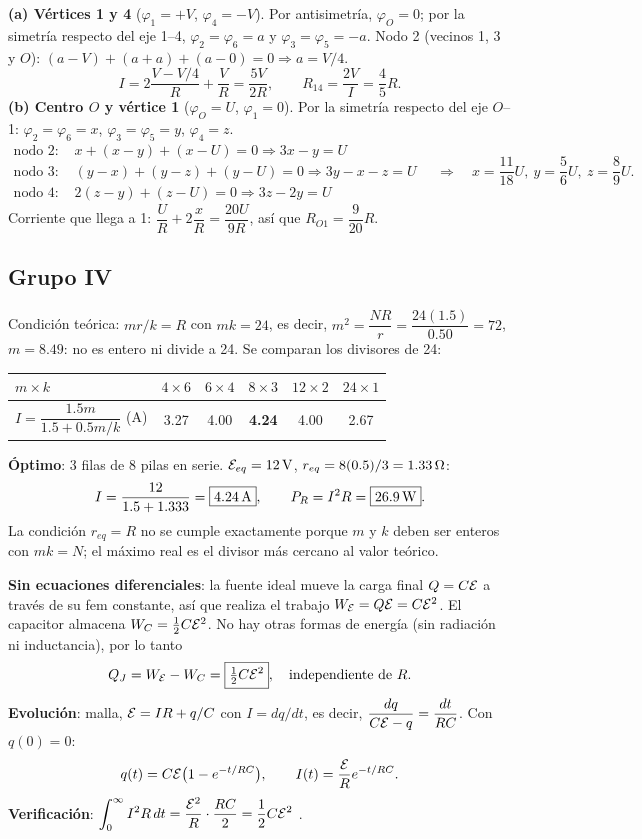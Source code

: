 \begin{center}\circRueda\end{center}
\textbf{(a) Vértices 1 y 4} ($\varphi_1=+V$, $\varphi_4=-V$). Por antisimetría, $\varphi_O=0$; por la simetría respecto del eje 1--4, $\varphi_2=\varphi_6=a$ y $\varphi_3=\varphi_5=-a$. Nodo 2 (vecinos 1, 3 y $O$): $(a-V)+(a+a)+(a-0)=0\Rightarrow a=V/4$.
\[
I=2\frac{V-V/4}{R}+\frac{V}{R}=\frac{5V}{2R},\qquad R_{14}=\frac{2V}{I}=\boxed{\frac45R}.
\]
\textbf{(b) Centro $O$ y vértice 1} ($\varphi_O=U$, $\varphi_1=0$). Por la simetría respecto del eje $O$--1: $\varphi_2=\varphi_6=x$, $\varphi_3=\varphi_5=y$, $\varphi_4=z$.
\[
\begin{aligned}
\text{nodo 2: }& x+(x-y)+(x-U)=0\Rightarrow3x-y=U\\
\text{nodo 3: }& (y-x)+(y-z)+(y-U)=0\Rightarrow3y-x-z=U\\
\text{nodo 4: }& 2(z-y)+(z-U)=0\Rightarrow3z-2y=U
\end{aligned}
\quad\Rightarrow\quad x=\frac{11}{18}U,\ y=\frac56U,\ z=\frac89U.
\]
Corriente que llega a 1: $\dfrac UR+2\dfrac xR=\dfrac{20U}{9R}$, así que $\boxed{R_{O1}=\dfrac{9}{20}R}$.

\subsection*{Grupo IV}
Condición teórica: $mr/k=R$ con $mk=24$, es decir, $m^2=\dfrac{NR}{r}=\dfrac{24(1.5)}{0.50}=72$, $m=8.49$: no es entero ni divide a 24. Se comparan los divisores de 24:
\begin{center}
\begin{tabular}{lccccc}
\toprule
$m\times k$ & $4\times6$ & $6\times4$ & $8\times3$ & $12\times2$ & $24\times1$\\
\midrule
$I=\dfrac{1.5m}{1.5+0.5m/k}$ (A) & 3.27 & 4.00 & \textbf{4.24} & 4.00 & 2.67\\
\bottomrule
\end{tabular}
\end{center}
\textbf{Óptimo}: 3 filas de 8 pilas en serie. $\fem_{eq}=12\uu V$, $r_{eq}=8(0.5)/3=1.33\ohm$:
\[
I=\frac{12}{1.5+1.333}=\boxed{4.24\uu A},\qquad P_R=I^2R=\boxed{26.9\uu W}.
\]
La condición $r_{eq}=R$ no se cumple exactamente porque $m$ y $k$ deben ser enteros con $mk=N$; el máximo real es el divisor más cercano al valor teórico.

\textbf{Sin ecuaciones diferenciales}: la fuente ideal mueve la carga final $Q=C\fem$ a través de su fem constante, así que realiza el trabajo $W_\fem=Q\fem=C\fem^2$. El capacitor almacena $W_C=\tfrac12C\fem^2$. No hay otras formas de energía (sin radiación ni inductancia), por lo tanto
\[
Q_J=W_\fem-W_C=\boxed{\tfrac12C\fem^2},\quad\text{independiente de }R.
\]
\textbf{Evolución}: malla, $\fem=IR+q/C$ con $I=dq/dt$, es decir, $\dfrac{dq}{C\fem-q}=\dfrac{dt}{RC}$. Con $q(0)=0$:
\[
q(t)=C\fem\big(1-e^{-t/RC}\big),\qquad I(t)=\frac{\fem}{R}e^{-t/RC}.
\]
\textbf{Verificación}: $\displaystyle\int_0^\infty I^2R\,dt=\frac{\fem^2}{R}\cdot\frac{RC}{2}=\frac12C\fem^2$ \checkmark.

